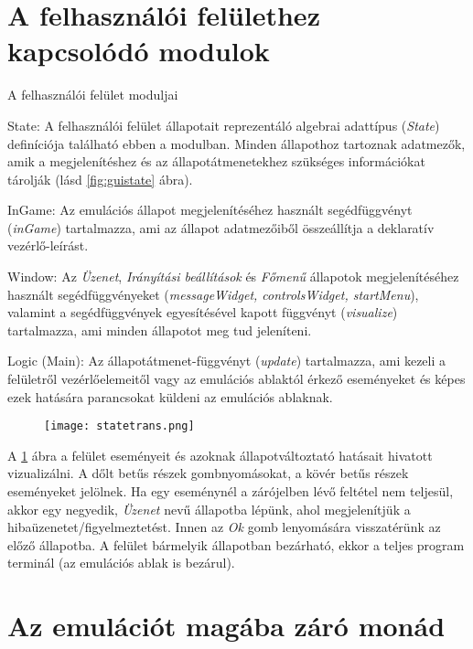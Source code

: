 \section{A felhasználói felülethez kapcsolódó modulok}

\begin{compactdesc}
	\item[A felhasználói felület moduljai]
	\item[State:]
	A felhasználói felület állapotait reprezentáló algebrai adattípus (\emph{State}) definíciója található ebben a modulban. Minden állapothoz tartoznak adatmezők, amik a megjelenítéshez és az állapotátmenetekhez szükséges információkat tárolják (lásd \ref{fig:guistate} ábra).
	\item[InGame:]
	Az emulációs állapot megjelenítéséhez használt segédfüggvényt (\emph{inGame}) tartalmazza, ami az állapot adatmezőiből összeállítja a deklaratív vezérlő-leírást.
	\item[Window:]
	Az \emph{Üzenet}, \emph{Irányítási beállítások} és \emph{Főmenű} állapotok megjelenítéséhez használt segédfüggvényeket (\emph{messageWidget, controlsWidget, startMenu}), valamint a segédfüggvények egyesítésével kapott függvényt (\emph{visualize}) tartalmazza, ami minden állapotot meg tud jeleníteni.
	\item[Logic (Main):]
	Az állapotátmenet-függvényt (\emph{update}) tartalmazza, ami kezeli a felületről vezérlőelemeitől vagy az emulációs ablaktól érkező eseményeket és képes ezek hatására parancsokat küldeni az emulációs ablaknak. 
\end{compactdesc}

\begin{figure}[H]
	\centering
	\texttt{[image: statetrans.png]}
	\caption{}
	\label{fig:states}
\end{figure}

A \ref{fig:states} ábra a felület eseményeit és azoknak állapotváltoztató hatásait hivatott vizualizálni. A dőlt betűs részek gombnyomásokat, a kövér betűs részek eseményeket jelölnek. Ha egy eseménynél a zárójelben lévő feltétel nem teljesül, akkor egy negyedik, \emph{Üzenet} nevű állapotba lépünk, ahol megjelenítjük a hibaüzenetet/figyelmeztetést. Innen az \emph{Ok} gomb lenyomására visszatérünk az előző állapotba. A felület bármelyik állapotban bezárható, ekkor a teljes program terminál (az emulációs ablak is bezárul).

\section{Az emulációt magába záró monád}

